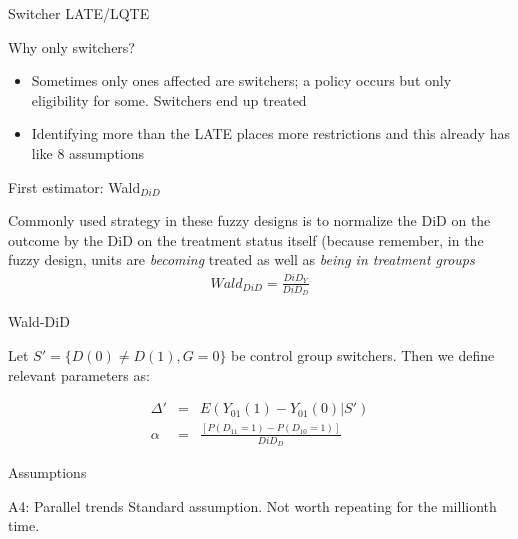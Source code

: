 \documentclass{beamer}
\begin{document}
\begin{frame}{Switcher LATE/LQTE}

Why only switchers?


\begin{itemize}
\item Sometimes only ones affected are switchers; a policy occurs but only eligibility for some.  Switchers end up treated
\item Identifying more than the LATE places more restrictions and this already has like 8 assumptions
\end{itemize}

\end{frame}



\begin{frame}{First estimator: Wald$_{DiD}$}

Commonly used strategy in these fuzzy designs is to normalize the DiD on the outcome by the DiD on the treatment status itself (because remember, in the fuzzy design, units are \emph{becoming} treated as well as \emph{being in treatment groups} \\

\begin{eqnarray*}
Wald_{DiD} = \frac{DiD_Y}{DiD_D}
\end{eqnarray*}

\bigskip



\end{frame}


\begin{frame}{Wald-DiD}

Let $S'= \{ D(0) \neq D(1), G=0 \}$ be control group switchers.  Then we define relevant parameters as:

\begin{eqnarray*}
\Delta ' &=& E(Y_{01}(1) - Y_{01}(0) | S') \\
\alpha &=& \frac{
[P(D_{11}=1) - P(D_{10}=1)]}{DiD_D}
\end{eqnarray*}

\end{frame}

\begin{frame}{Assumptions}

\begin{block}{A4: Parallel trends}
Standard assumption. Not worth repeating for the millionth time.
\end{block}

\end{frame}
\end{document}
